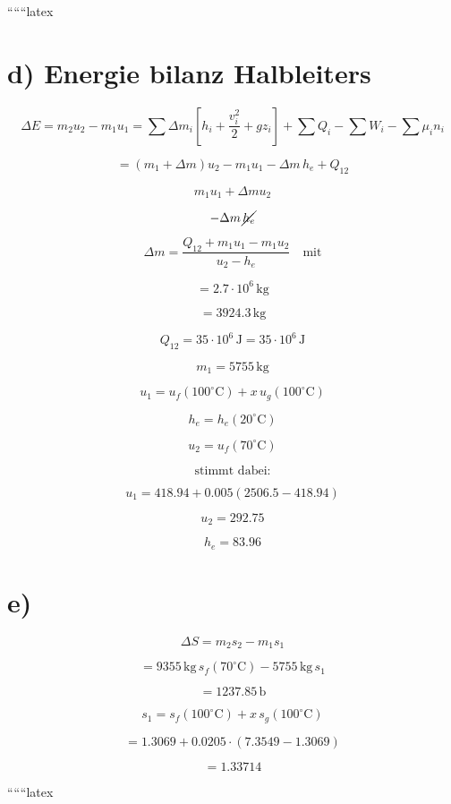 ``````latex


\section*{d) Energie bilanz Halbleiters}

\[
\Delta E = m_2 u_2 - m_1 u_1 = \sum \Delta m_i \left[ h_i + \frac{v_i^2}{2} + g z_i \right] + \sum Q_i - \sum W_i - \sum \mu_i n_i
\]

\[
= (m_1 + \Delta m) u_2 - m_1 u_1 - \Delta m \, h_e + Q_{12}
\]

\[
m_1 u_1 + \Delta m u_2
\]

\[
- \Delta m \, \cancel{h_e}
\]

\[
\Delta m = \frac{Q_{12} + m_1 u_1 - m_1 u_2}{u_2 - h_e} \quad \text{mit}
\]

\[
= 2.7 \cdot 10^6 \, \text{kg}
\]

\[
= 3924.3 \, \text{kg}
\]

\[
Q_{12} = 35 \cdot 10^6 \, \text{J} = 35 \cdot 10^6 \, \text{J}
\]

\[
m_1 = 5755 \, \text{kg}
\]

\[
u_1 = u_f (100^\circ \text{C}) + x \, u_g (100^\circ \text{C})
\]

\[
h_e = h_e (20^\circ \text{C})
\]

\[
u_2 = u_f (70^\circ \text{C})
\]

\[
\text{stimmt dabei:}
\]

\[
u_1 = 418.94 + 0.005 (2506.5 - 418.94)
\]

\[
u_2 = 292.75
\]

\[
h_e = 83.96
\]

\section*{e)}

\[
\Delta S = m_2 s_2 - m_1 s_1
\]

\[
= 9355 \, \text{kg} \, s_f (70^\circ \text{C}) - 5755 \, \text{kg} \, s_1
\]

\[
= 1237.85 \, \text{b}
\]

\[
s_1 = s_f (100^\circ \text{C}) + x \, s_g (100^\circ \text{C})
\]

\[
= 1.3069 + 0.0205 \cdot (7.3549 - 1.3069)
\]

\[
= 1.33714
\]

``````latex


